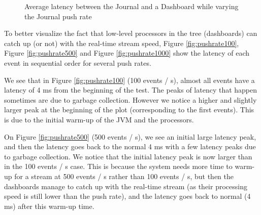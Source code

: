 \begin{figure}
  \begin{center} 
    \caption{Average latency between the Journal and a Dashboard while varying the Journal push rate}
    \label{fig:latencyplot}
  \end{center}
\end{figure}

To better visualize the fact that low-level processors in the tree (dashboards) can catch up (or not) with the real-time stream speed, Figure \ref{fig:pushrate100}, Figure \ref{fig:pushrate500} and Figure \ref{fig:pushrate1000} show the latency of each event in sequential order for several push rates. 

We see that in Figure \ref{fig:pushrate100} (100 events / s), almost all events have a latency of 4 ms from the beginning of the test. The peaks of latency that happen sometimes are due to garbage collection. However we notice a higher and slightly larger peak at the beginning of the plot (corresponding to the first events). This is due to the initial warm-up of the JVM and the processors.

On Figure \ref{fig:pushrate500} (500 events / s), we see an initial large latency peak, and then the latency goes back to the normal 4 ms with a few latency peaks due to garbage collection. We notice that the initial latency peak is now larger than in the 100 events / s case. This is because the system needs more time to warm-up for a stream at 500 events / s rather than 100 events / s, but then the dashboards manage to catch up with the real-time stream (as their processing speed is still lower than the push rate), and the latency goes back to normal (4 ms) after this warm-up time.

